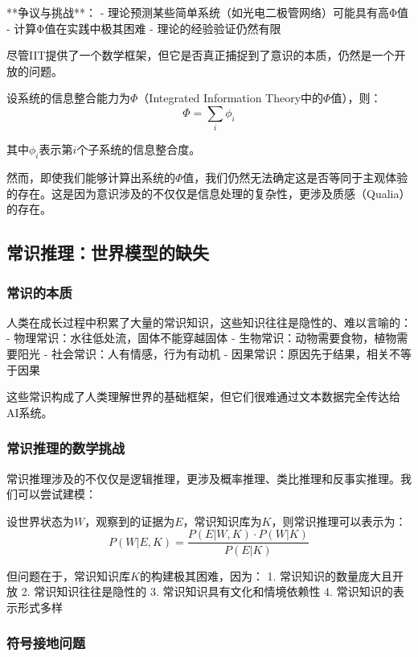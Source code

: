 **争议与挑战**：
- 理论预测某些简单系统（如光电二极管网络）可能具有高Φ值
- 计算Φ值在实践中极其困难
- 理论的经验验证仍然有限

尽管IIT提供了一个数学框架，但它是否真正捕捉到了意识的本质，仍然是一个开放的问题。

设系统的信息整合能力为$\Phi$（Integrated Information Theory中的$\Phi$值），则：
\begin{equation}
\Phi = \sum_{i} \phi_i
\end{equation}

其中$\phi_i$表示第$i$个子系统的信息整合度。

然而，即使我们能够计算出系统的$\Phi$值，我们仍然无法确定这是否等同于主观体验的存在。这是因为意识涉及的不仅仅是信息处理的复杂性，更涉及质感（Qualia）的存在。

\subsection{常识推理：世界模型的缺失}

\subsubsection{常识的本质}

人类在成长过程中积累了大量的常识知识，这些知识往往是隐性的、难以言喻的：
- 物理常识：水往低处流，固体不能穿越固体
- 生物常识：动物需要食物，植物需要阳光
- 社会常识：人有情感，行为有动机
- 因果常识：原因先于结果，相关不等于因果

这些常识构成了人类理解世界的基础框架，但它们很难通过文本数据完全传达给AI系统。

\subsubsection{常识推理的数学挑战}

常识推理涉及的不仅仅是逻辑推理，更涉及概率推理、类比推理和反事实推理。我们可以尝试建模：

设世界状态为$W$，观察到的证据为$E$，常识知识库为$K$，则常识推理可以表示为：
\begin{equation}
P(W|E, K) = \frac{P(E|W, K) \cdot P(W|K)}{P(E|K)}
\end{equation}

但问题在于，常识知识库$K$的构建极其困难，因为：
1. 常识知识的数量庞大且开放
2. 常识知识往往是隐性的
3. 常识知识具有文化和情境依赖性
4. 常识知识的表示形式多样

\subsubsection{符号接地问题}

